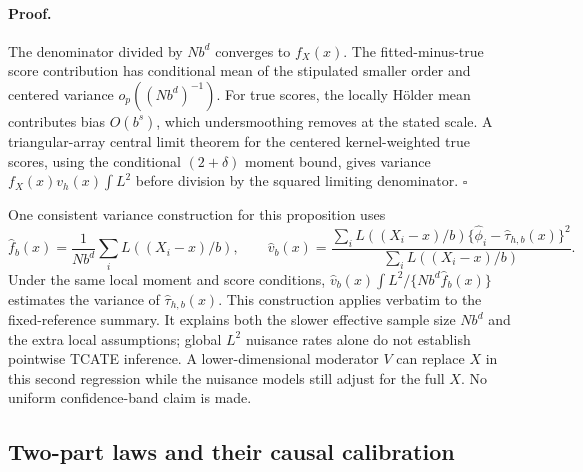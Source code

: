 \paragraph{Proof.}
The denominator divided by $Nb^d$ converges to $f_X(x)$. The fitted-minus-true score contribution has conditional mean of the stipulated smaller order and centered variance $o_p((Nb^d)^{-1})$. For true scores, the locally H\"older mean contributes bias $O(b^s)$, which undersmoothing removes at the stated scale. A triangular-array central limit theorem for the centered kernel-weighted true scores, using the conditional $(2+\delta)$ moment bound, gives variance $f_X(x)v_h(x)\int L^2$ before division by the squared limiting denominator. $\square$

One consistent variance construction for this proposition uses
\[
 \widehat f_b(x)=\frac{1}{Nb^d}\sum_iL((X_i-x)/b),\qquad
 \widehat v_b(x)=\frac{\sum_iL((X_i-x)/b)\{\widehat\phi_i-\widehat\tau_{h,b}(x)\}^2}{\sum_iL((X_i-x)/b)}.
\]
Under the same local moment and score conditions, $\widehat v_b(x)\int L^2/\{Nb^d\widehat f_b(x)\}$ estimates the variance of $\widehat\tau_{h,b}(x)$. This construction applies verbatim to the fixed-reference summary. It explains both the slower effective sample size $Nb^d$ and the extra local assumptions; global $L^2$ nuisance rates alone do not establish pointwise TCATE inference. A lower-dimensional moderator $V$ can replace $X$ in this second regression while the nuisance models still adjust for the full $X$. No uniform confidence-band claim is made.

\subsection{Two-part laws and their causal calibration}

